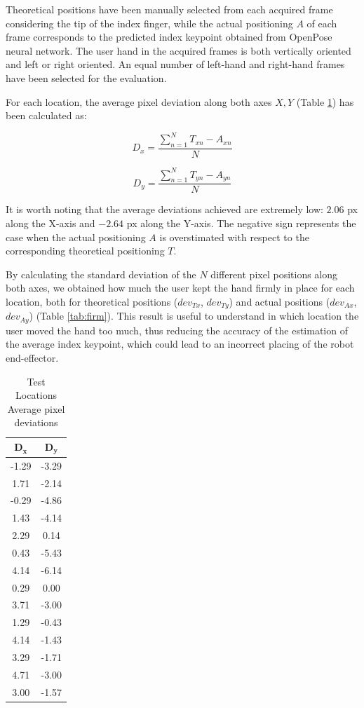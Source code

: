 \documentclass[letterpaper, 10 pt, conference]{ieeeconf}  %
\begin{document}
Theoretical positions have been manually selected from each acquired frame considering the tip of the index finger, while the actual positioning $A$ of each frame corresponds to the predicted index keypoint obtained from OpenPose neural network. The user hand in the acquired frames is both vertically oriented and left or right oriented. An equal number of left-hand and right-hand frames have been selected for the evaluation.

For each location, the average pixel deviation along both axes $X, Y$ (Table \ref{tab:dev}) has been calculated as:

\begin{equation}
D_x = \frac{\sum_{n=1}^{N} T_{xn} - A_{xn}}{N}
\end{equation}

\begin{equation}
D_y = \frac{\sum_{n=1}^{N} T_{yn} - A_{yn}}{N}
\end{equation}

It is worth noting that the average deviations achieved are extremely low: $2.06$ px along the X-axis and $-2.64$ px along the Y-axis. The negative sign represents the case when the actual positioning $A$ is overstimated with respect to the corresponding theoretical positioning $T$.

By calculating the standard deviation of the $N$ different pixel positions along both axes, we obtained how much the user kept the hand firmly in place for each location, both for theoretical positions ($dev_{Tx}$, $dev_{Ty}$) and actual positions ($dev_{Ax}$, $dev_{Ay}$) (Table \ref{tab:firm}). This result is useful to understand in which location the user moved the hand too much, thus reducing the accuracy of the estimation of the average index keypoint, which could lead to an incorrect placing of the robot end-effector.

\begin{table}[h]
\begin{center}
\caption{Test Locations Average pixel deviations}
\label{tab:dev}
\begin{tabular}{|c||c|}
\hline
$\mathbf{D_x}$ & $\mathbf{D_y}$ \\
\hline
-1.29 & -3.29\\
1.71 & -2.14\\
-0.29 & -4.86\\
1.43 & -4.14\\
2.29 & 0.14\\
0.43 & -5.43\\
4.14 & -6.14\\
0.29 & 0.00\\
3.71 & -3.00\\
1.29 & -0.43\\
4.14 & -1.43\\
3.29 & -1.71\\
4.71 & -3.00\\
3.00 & -1.57\\
\hline
\end{tabular}
\end{center}
\end{table}
\end{document}

